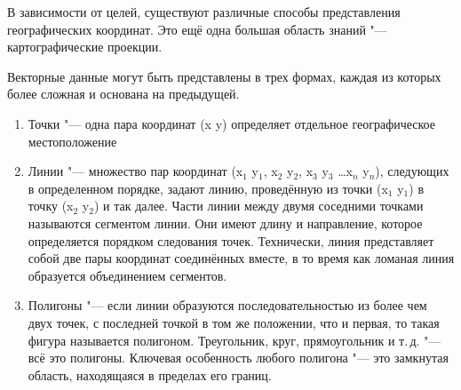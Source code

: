 В зависимости от целей, существуют различные способы представления
географических координат. Это ещё одна большая область знаний "---
картографические проекции.

Векторные данные могут быть представлены в трех формах, каждая из которых
более сложная и основана на предыдущей.

\begin{enumerate}
\item Точки "--- одна пара координат (x y) определяет отдельное
географическое местоположение
\item Линии "--- множество пар координат (x$_1$ y$_1$, x$_2$ y$_2$,
x$_3$ y$_3$ \ldots x$_n$ y$_n$), следующих в определенном порядке, задают
линию, проведённую из точки (x$_1$ y$_1$) в точку (x$_2$ y$_2$) и так далее.
Части линии между двумя соседними точками называются сегментом линии. Они
имеют длину и направление, которое определяется порядком следования точек.
Технически, линия представляет собой две пары координат соединённых вместе,
в то время как ломаная линия образуется объединением сегментов.
\item Полигоны "--- если линии образуются последовательностью из более
чем двух точек, с последней точкой в том же положении, что и первая, то
такая фигура называется полигоном. Треугольник, круг, прямоугольник и т.\,д. "---
всё это полигоны. Ключевая особенность любого полигона "--- это замкнутая
область, находящаяся в пределах его границ.
\end{enumerate}
